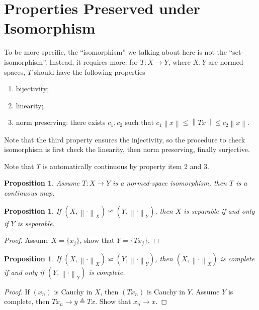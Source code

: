\documentclass[12pt,a4paper]{article}
\numberwithin{equation}{section}
\theoremstyle{mystyle}
\newtheorem{proposition}[definition]{Proposition}
\newcommand{\norm}[1]{\left\lVert #1 \right\rVert}
\begin{document}
	\section{Properties Preserved under Isomorphism}
	To be more specific, the ``isomorphism'' we talking about here is not the ``set-isomorphism''. Instead, it requires more: for $T:X\to Y$, where $X,Y$ are normed spaces, $T$ should have the following properties
	\begin{enumerate}
		\item bijectivity;
		\item linearity;
		\item norm preserving: there exists $c_1,c_2$ such that $c_1\norm{x}\leq \norm{Tx}\leq c_2\norm{x}$.
	\end{enumerate}
	Note that the third property ensures the injectivity, so the procedure to check isomorphism is first check the linearity, then norm preserving, finally surjective.
	
	Note that $T$ is automatically continuous by property item 2 and 3.
	\begin{proposition}
		Assume $T:X\to Y$ is a normed-space isomorphism, then $T$ is a continuous map.
	\end{proposition}
	
	\begin{proposition}
		If $(X,\norm{\cdot}_X)\backsimeq (Y,\norm{\cdot}_Y)$, then $X$ is separable if and only if $Y$ is separable.
	\end{proposition}
	\begin{proof}
		Assume $X=\overline{\{x_j\}}$, show that $Y=\overline{\{Tx_j\}}$.
	\end{proof}
	\begin{proposition}
		If $(X,\norm{\cdot}_X)\backsimeq (Y,\norm{\cdot}_Y)$, then $(X,\norm{\cdot}_X)$ is complete if and only if $(Y,\norm{\cdot}_Y)$ is complete.
	\end{proposition}
	\begin{proof}
		If $(x_n)$ is Cauchy in $X$, then $(Tx_n)$ is Cauchy in $Y$. Assume $Y$ is complete, then $Tx_n\to y\triangleq Tx$. Show that $x_n\to x$.
	\end{proof}
\end{document}
